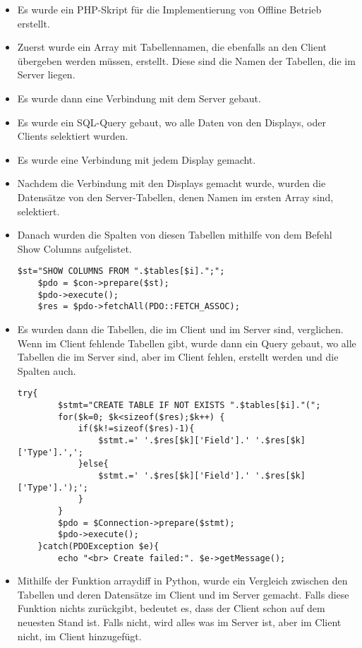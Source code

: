 \begin{itemize}
	\item Es wurde ein PHP-Skript f\"ur die Implementierung von Offline Betrieb erstellt.
	\item Zuerst wurde ein Array mit Tabellennamen, die ebenfalls an den Client übergeben werden müssen,  erstellt. Diese sind die Namen der Tabellen, die im Server liegen.
	\item Es wurde dann eine Verbindung mit dem Server gebaut.
	\item Es wurde ein SQL-Query gebaut, wo alle Daten von den Displays, oder Clients selektiert wurden.
	\item Es wurde eine Verbindung mit jedem Display gemacht.
	\item Nachdem die Verbindung mit den Displays gemacht wurde, wurden die Datens\"atze von den Server-Tabellen, denen Namen im ersten Array sind, selektiert.
	\item Danach wurden die Spalten von diesen Tabellen mithilfe von dem Befehl Show Columns aufgelistet.
	\begin{lstlisting}[frame=single]
	$st="SHOW COLUMNS FROM ".$tables[$i].";";
	$pdo = $con->prepare($st);
	$pdo->execute();
	$res = $pdo->fetchAll(PDO::FETCH_ASSOC);
	\end{lstlisting}
	\item Es wurden dann die Tabellen, die im Client und im Server sind, verglichen. Wenn im Client fehlende Tabellen gibt, wurde dann ein Query gebaut, wo alle Tabellen die im Server sind, aber im Client fehlen, erstellt werden und die Spalten auch.
	 \begin{lstlisting}[frame=single]
	 try{
	 	$stmt="CREATE TABLE IF NOT EXISTS ".$tables[$i]."(";
	 	for($k=0; $k<sizeof($res);$k++) {
	 		if($k!=sizeof($res)-1){
	 			$stmt.=' '.$res[$k]['Field'].' '.$res[$k]['Type'].',';
	 		}else{
	 			$stmt.=' '.$res[$k]['Field'].' '.$res[$k]['Type'].');';
	 		}
	 	}
	 	$pdo = $Connection->prepare($stmt);
	 	$pdo->execute();
	}catch(PDOException $e){
	 	echo "<br> Create failed:". $e->getMessage();
	 \end{lstlisting}
	 \item Mithilfe der Funktion arraydiff in Python, wurde ein Vergleich zwischen den Tabellen und deren Datens\"atze im Client und im Server gemacht. Falls diese Funktion nichts zur\"uckgibt, bedeutet es, dass der Client schon auf dem neuesten Stand ist. Falls nicht, wird alles was im Server ist, aber im Client nicht, im Client hinzugef\"ugt.
\end{itemize}
